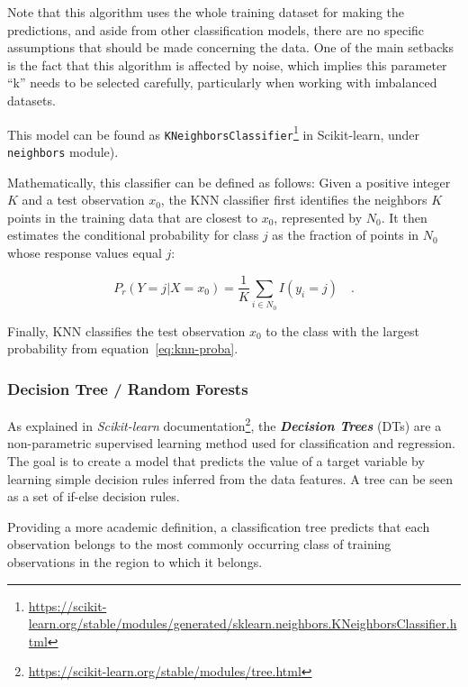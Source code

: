 \documentclass[a4paper, 12pt]{book}
\begin{document}
Note that this algorithm uses the whole training dataset for making the predictions, and aside from other classification models, there are no specific assumptions that should be made concerning the data. One of the main setbacks is the fact that this algorithm is affected by noise, which implies this parameter ``k'' needs to be selected carefully, particularly when working with imbalanced datasets.

This model can be found as \texttt{KNeighborsClassifier}\footnote{\url{https://scikit-learn.org/stable/modules/generated/sklearn.neighbors.KNeighborsClassifier.html}} in Scikit-learn, under \texttt{neighbors} module).

Mathematically, this classifier can be defined as follows: Given a positive integer $K$ and a test observation $x_{0}$, the KNN classifier first identifies the neighbors $K$ points in the training data that are closest to $x_{0}$, represented by $N_{0}$. It then estimates the conditional probability for class $j$ as the fraction of points in $N_{0}$ whose response values equal $j$:

\begin{center}
\begin{equation} \label{eq:knn-proba}
P_{r}(Y = j | X = x_{0})= \frac{1}{K} \sum_{i \in N_{0}}^{} I(y_{i} = j)
 \quad.
\end{equation}
\end{center}

Finally, KNN classifies the test observation $x_{0}$ to the class with the largest probability from equation~\ref{eq:knn-proba}.

\subsubsection{Decision Tree / Random Forests}
\label{sssec:decision-trees}


As explained in \textit{Scikit-learn} documentation\footnote{\url{https://scikit-learn.org/stable/modules/tree.html}}, the \textbf{\textit{Decision Trees}} (DTs) are a non-parametric supervised learning method used for classification and regression. The goal is to create a model that predicts the value of a target variable by learning simple decision rules inferred from the data features. A tree can be seen as a set of if-else decision rules.

Providing a more academic definition, a classification tree predicts that each observation belongs to the most commonly 
occurring class of training observations in the region to which it belongs.
\end{document}
